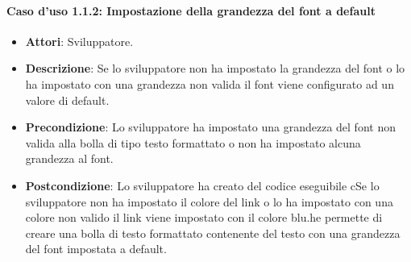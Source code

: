 \paragraph{Caso d'uso 1.1.2: Impostazione della grandezza del font a default}
\begin{itemize}
\item\textbf{Attori}: Sviluppatore.
\item\textbf{Descrizione}: Se lo sviluppatore non ha impostato la grandezza del font o lo ha impostato con una grandezza non valida il font viene configurato ad un valore di default.
\item\textbf{Precondizione}: Lo sviluppatore ha impostato una grandezza del font non valida alla bolla di tipo testo formattato o non ha impostato alcuna grandezza al font.
\item\textbf{Postcondizione}: Lo sviluppatore ha creato del codice eseguibile cSe lo sviluppatore non ha impostato il colore del link o lo ha impostato con una colore non valido il link viene impostato con il colore blu.he permette di creare una bolla di testo formattato contenente del testo con una grandezza del font impostata a default.
\end{itemize}